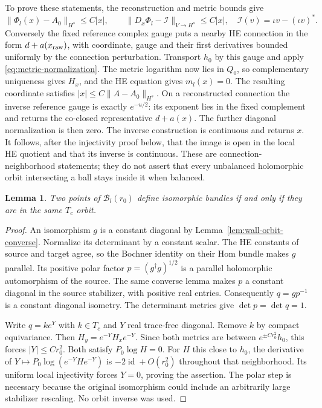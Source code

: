 \documentclass[11pt]{amsart}
\newtheorem{lemma}[theorem]{Lemma}
\theoremstyle{definition}
\theoremstyle{remark}
\newcommand{\id}{\operatorname{id}}
\newcommand{\cB}{\mathcal B}
\begin{document}
To prove these statements, the reconstruction and metric bounds give
\begin{equation}\label{eq:connection-estimates}
 \|\Phi_l(x)-A_0\|_{H^s}\le C|x|,\qquad
 \|D_x\Phi_l-\mathcal I\|_{V\to H^s}\le C|x|,
 \quad \mathcal I(v)=\iota v-(\iota v)^*.
\end{equation}
Conversely the fixed reference complex gauge puts a nearby HE connection
in the form $d+a(x_{\rm raw})$, with coordinate, gauge and their first
derivatives bounded uniformly by the connection perturbation. Transport
$h_0$ by this gauge and apply \eqref{eq:metric-normalization}. The
metric logarithm now lies in $Q_0$, so complementary uniqueness gives
$H_x$, and the HE equation gives $m_l(x)=0$. The resulting coordinate
satisfies $|x|\le C\|A-A_0\|_{H^s}$.
On a reconstructed connection the inverse reference gauge is exactly
$e^{-u/2}$: its exponent lies in the fixed complement and returns the
co-closed representative $d+a(x)$. The further diagonal normalization
is then zero. The inverse construction is continuous and returns $x$.
It follows, after the injectivity proof below, that the image is open
in the local HE quotient and that its inverse is continuous. These are
connection-neighborhood statements; they do not assert that every
unbalanced holomorphic orbit intersecting a ball stays inside it when
balanced.

\begin{lemma}\label{lem:compact-uniqueness}
Two points of $\cB_l(r_0)$ define isomorphic bundles if and only if
they are in the same $T_c$ orbit.
\end{lemma}
\begin{proof}
An isomorphism $g$ is a constant diagonal by
Lemma~\ref{lem:wall-orbit-converse}. Normalize its determinant by a
constant scalar. The HE constants of source and target agree, so the
Bochner identity on their Hom bundle makes $g$ parallel. Its positive
polar factor $p=(g^\dagger g)^{1/2}$ is a parallel holomorphic
automorphism of the source. The same converse lemma makes $p$ a
constant diagonal in the source stabilizer, with positive real entries.
Consequently $q=gp^{-1}$ is a constant diagonal isometry.
The determinant metrics give $\det p=\det q=1$.

Write $q=ke^Y$ with $k\in T_c$ and $Y$ real trace-free diagonal.
Remove $k$ by compact equivariance. Then
$H_y=e^{-Y}H_xe^{-Y}$. Since both metrics are between
$e^{\pm Cr_0^2}h_0$, this forces $|Y|\le Cr_0^2$.
Both satisfy $P_0\log H=0$. For $H$ this close to $h_0$,
the derivative of $Y\mapsto P_0\log(e^{-Y}He^{-Y})$ is
$-2\id+O(r_0^2)$ throughout that neighborhood. Its uniform local
injectivity forces $Y=0$, proving the assertion. The polar step is
necessary because the original isomorphism could include an arbitrarily
large stabilizer rescaling. No orbit inverse was used.
\end{proof}
\end{document}
